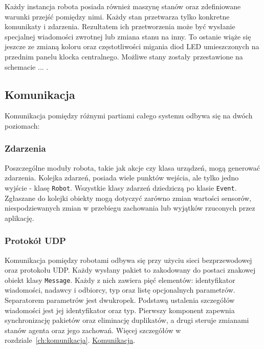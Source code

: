 Każdy instancja robota posiada również maszynę stanów oraz zdefiniowane warunki przejść pomiędzy nimi. Każdy stan przetwarza tylko konkretne komunikaty i zdarzenia. Rezultatem ich przetworzenia może być wysłanie specjalnej wiadomości zwrotnej lub zmiana stanu na inny. To ostanie wiąże się jeszcze ze zmianą koloru oraz częstotliwości migania diod LED umieszczonych na przednim panelu klocka centralnego. Możliwe stany zostały przestawione na schemacie ... .


\subsection{Komunikacja}

\indent \indent Komunikacja pomiędzy różnymi partiami całego systemu odbywa się na dwóch poziomach:

\subsubsection{Zdarzenia}

Poszczególne moduły robota, takie jak akcje czy klasa urządzeń, mogą generować zdarzenia. Kolejka zdarzeń, posiada wiele punktów wejścia, ale tylko jedno wyjście - klasę {\tt Robot}. Wszystkie klasy zdarzeń dziedziczą po klasie {\tt Event}. Zgłaszane do kolejki obiekty mogą dotyczyć zarówno zmian wartości sensorów, niespodziewanych zmian w przebiegu zachowania lub wyjątków rzuconych przez aplikację.


\subsubsection{Protokół UDP}

Komunikacja pomiędzy robotami odbywa się przy użyciu sieci bezprzewodowej oraz protokołu UDP. Każdy wysłany pakiet to zakodowany do postaci znakowej obiekt klasy {\tt Message}. Każdy z nich zawiera pięć elementów: identyfikator wiadomości, nadawcy i odbiorcy, typ oraz listę opcjonalnych parametrów. Separatorem parametrów jest dwukropek. Podstawą ustalenia szczegółów wiadomości jest jej identyfikator oraz typ. Pierwszy komponent zapewnia synchronizację pakietów oraz eliminację duplikatów, a drugi steruje zmianami stanów agenta oraz jego zachowań. Więcej szczegółów w rozdziale~\ref{ch:komunikacja}. \hyperref[ch:komunikacja]{Komunikacja}.

